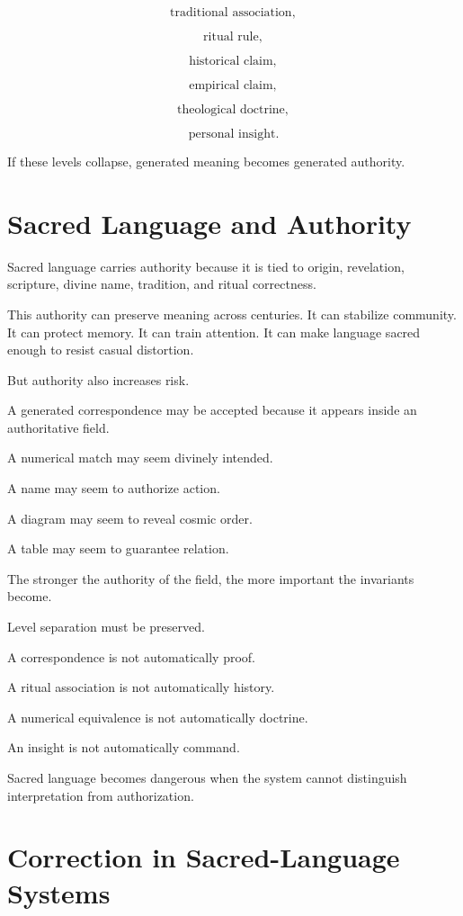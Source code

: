 \documentclass[11pt]{book}
\begin{document}
\[
\text{traditional association},
\]

\[
\text{ritual rule},
\]

\[
\text{historical claim},
\]

\[
\text{empirical claim},
\]

\[
\text{theological doctrine},
\]

\[
\text{personal insight}.
\]

If these levels collapse, generated meaning becomes generated authority.

\section{Sacred Language and Authority}

Sacred language carries authority because it is tied to origin, revelation, scripture, divine name, tradition, and ritual correctness.

This authority can preserve meaning across centuries. It can stabilize community. It can protect memory. It can train attention. It can make language sacred enough to resist casual distortion.

But authority also increases risk.

A generated correspondence may be accepted because it appears inside an authoritative field.

A numerical match may seem divinely intended.

A name may seem to authorize action.

A diagram may seem to reveal cosmic order.

A table may seem to guarantee relation.

The stronger the authority of the field, the more important the invariants become.

Level separation must be preserved.

A correspondence is not automatically proof.

A ritual association is not automatically history.

A numerical equivalence is not automatically doctrine.

An insight is not automatically command.

Sacred language becomes dangerous when the system cannot distinguish interpretation from authorization.

\section{Correction in Sacred-Language Systems}
\end{document}
